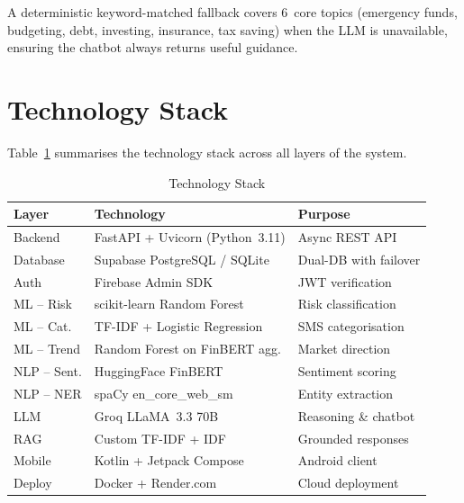 \documentclass[conference]{IEEEtran}
\begin{document}
A deterministic keyword-matched fallback covers 6~core topics (emergency funds, budgeting, debt, investing, insurance, tax saving) when the LLM is unavailable, ensuring the chatbot always returns useful guidance.

\section{Technology Stack}

Table~\ref{tab:techstack} summarises the technology stack across all layers of the system.

\begin{table}[!t]
\centering
\caption{Technology Stack}
\label{tab:techstack}
\renewcommand{\arraystretch}{1.15}
\footnotesize
\begin{tabular}{p{1.4cm} p{2.8cm} p{3cm}}
\toprule
\textbf{Layer} & \textbf{Technology} & \textbf{Purpose} \\
\midrule
Backend       & FastAPI + Uvicorn (Python~3.11)     & Async REST API \\
Database      & Supabase PostgreSQL / SQLite        & Dual-DB with failover \\
Auth          & Firebase Admin SDK                  & JWT verification \\
ML -- Risk    & scikit-learn Random Forest          & Risk classification \\
ML -- Cat.    & TF-IDF + Logistic Regression        & SMS categorisation \\
ML -- Trend   & Random Forest on FinBERT agg.       & Market direction \\
NLP -- Sent.  & HuggingFace FinBERT                 & Sentiment scoring \\
NLP -- NER    & spaCy en\_core\_web\_sm              & Entity extraction \\
LLM           & Groq LLaMA~3.3 70B                  & Reasoning \& chatbot \\
RAG           & Custom TF-IDF + IDF                 & Grounded responses \\
Mobile        & Kotlin + Jetpack Compose            & Android client \\
Deploy        & Docker + Render.com                 & Cloud deployment \\
\bottomrule
\end{tabular}
\end{table}
\end{document}
